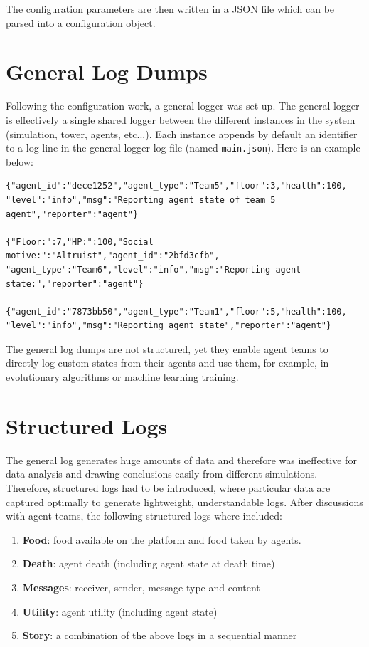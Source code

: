 The configuration parameters are then written in a JSON file which can be parsed into a configuration object.

\section{General Log Dumps}

Following the configuration work, a general logger was set up. The general logger is effectively a single shared logger between the different instances in the system (simulation, tower, agents, etc...). Each instance appends by default an identifier to a log line in the general logger log file (named \texttt{main.json}). Here is an example below:

\begin{verbatim}
{"agent_id":"dece1252","agent_type":"Team5","floor":3,"health":100,
"level":"info","msg":"Reporting agent state of team 5 agent","reporter":"agent"}

{"Floor:":7,"HP:":100,"Social motive:":"Altruist","agent_id":"2bfd3cfb",
"agent_type":"Team6","level":"info","msg":"Reporting agent state:","reporter":"agent"}

{"agent_id":"7873bb50","agent_type":"Team1","floor":5,"health":100,
"level":"info","msg":"Reporting agent state","reporter":"agent"}
\end{verbatim}

The general log dumps are not structured, yet they enable agent teams to directly log custom states from their agents and use them, for example, in evolutionary algorithms or machine learning training.

\section{Structured Logs}

The general log generates huge amounts of data and therefore was ineffective for data analysis and drawing conclusions easily from different simulations. Therefore, structured logs had to be introduced, where particular data are captured optimally to generate lightweight, understandable logs. After discussions with agent teams, the following structured logs where included:

\begin{enumerate}
    \item \textbf{Food}: food available on the platform and food taken by agents.
    \item \textbf{Death}: agent death (including agent state at death time)
    \item \textbf{Messages}: receiver, sender, message type and content
    \item \textbf{Utility}: agent utility (including agent state)
    \item \textbf{Story}: a combination of the above logs in a sequential manner
\end{enumerate}

